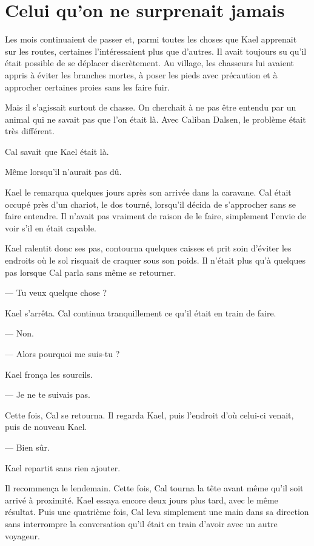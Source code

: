 \chapter{Celui qu'on ne surprenait jamais}
\label{chap:celui-quon-ne-surprenait-jamais}

Les mois continuaient de passer et, parmi toutes les choses que Kael apprenait
sur les routes, certaines l'intéressaient plus que d'autres. Il avait toujours
su qu'il était possible de se déplacer discrètement. Au village, les chasseurs
lui avaient appris à éviter les branches mortes, à poser les pieds avec
précaution et à approcher certaines proies sans les faire fuir.

Mais il s'agissait surtout de chasse. On cherchait à ne pas être entendu par
un animal qui ne savait pas que l'on était là. Avec Caliban Dalsen, le problème
était très différent.

Cal savait que Kael était là.

Même lorsqu'il n'aurait pas dû.

\scenebreak

Kael le remarqua quelques jours après son arrivée dans la caravane. Cal était
occupé près d'un chariot, le dos tourné, lorsqu'il décida de s'approcher sans
se faire entendre. Il n'avait pas vraiment de raison de le faire, simplement
l'envie de voir s'il en était capable.

Kael ralentit donc ses pas, contourna quelques caisses et prit soin d'éviter
les endroits où le sol risquait de craquer sous son poids. Il n'était plus
qu'à quelques pas lorsque Cal parla sans même se retourner.

— Tu veux quelque chose ?

Kael s'arrêta. Cal continua tranquillement ce qu'il était en train de faire.

— Non.

— Alors pourquoi me suis-tu ?

Kael fronça les sourcils.

— Je ne te suivais pas.

Cette fois, Cal se retourna. Il regarda Kael, puis l'endroit d'où celui-ci
venait, puis de nouveau Kael.

— Bien sûr.

Kael repartit sans rien ajouter.

Il recommença le lendemain. Cette fois, Cal tourna la tête avant même qu'il
soit arrivé à proximité. Kael essaya encore deux jours plus tard, avec le même
résultat. Puis une quatrième fois, Cal leva simplement une main dans sa
direction sans interrompre la conversation qu'il était en train d'avoir avec
un autre voyageur.

